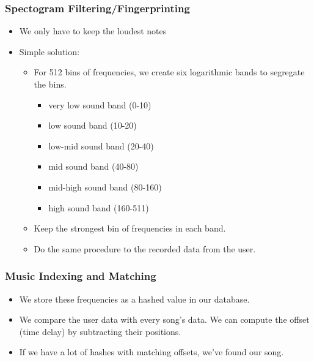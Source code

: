\documentclass{beamer}
\begin{document}
\begin{frame}
    \frametitle{Spectogram Filtering/Fingerprinting}
    \begin{itemize}
        \item We only have to keep the loudest notes
        \item Simple solution:
        \begin{itemize}
            \item For 512 bins of frequencies, we create six logarithmic bands to segregate the bins.
            \begin{itemize}
                \item very low sound band (0-10)
                \item low sound band (10-20)
                \item low-mid sound band (20-40)
                \item mid sound band (40-80)
                \item mid-high sound band (80-160)
                \item high sound band (160-511)
            \end{itemize}
            \item Keep the strongest bin of frequencies in each band.
            \item Do the same procedure to the recorded data from the user.
        \end{itemize}
    \end{itemize}    
\end{frame}

\begin{frame}
    \frametitle{Music Indexing and Matching}
    \begin{itemize}
        \item We store these frequencies as a hashed value in our database.
        \item We compare the user data with every song's data. We can compute the offset (time delay) by subtracting their positions.
        \item If we have a lot of hashes with matching offsets, we've found our song.
    \end{itemize}
\end{frame}
\end{document}
